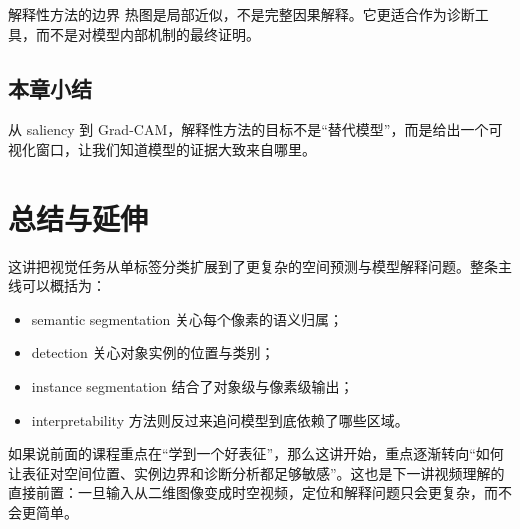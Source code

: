 \documentclass[a4paper]{article}
\begin{document}
\begin{warningbox}{解释性方法的边界}
热图是局部近似，不是完整因果解释。它更适合作为诊断工具，而不是对模型内部机制的最终证明。
\end{warningbox}

\subsection{本章小结}
从 saliency 到 Grad-CAM，解释性方法的目标不是“替代模型”，而是给出一个可视化窗口，让我们知道模型的证据大致来自哪里。

\section{总结与延伸}
这讲把视觉任务从单标签分类扩展到了更复杂的空间预测与模型解释问题。整条主线可以概括为：
\begin{itemize}
\item semantic segmentation 关心每个像素的语义归属；
\item detection 关心对象实例的位置与类别；
\item instance segmentation 结合了对象级与像素级输出；
\item interpretability 方法则反过来追问模型到底依赖了哪些区域。
\end{itemize}

如果说前面的课程重点在“学到一个好表征”，那么这讲开始，重点逐渐转向“如何让表征对空间位置、实例边界和诊断分析都足够敏感”。这也是下一讲视频理解的直接前置：一旦输入从二维图像变成时空视频，定位和解释问题只会更复杂，而不会更简单。
\end{document}
